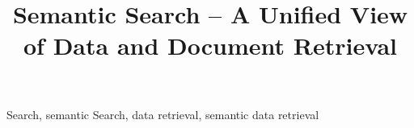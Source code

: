 \documentclass{elsart3p}    %
\begin{document}
\begin{frontmatter}

\title{Semantic Search -- A Unified View of Data and Document Retrieval}




\medskip



\begin{abstract}
\end{abstract}


\begin{keyword}
Search, semantic Search, data retrieval, semantic data retrieval
\end{keyword}
\end{frontmatter}




%
%






\clearpage
\end{document}
